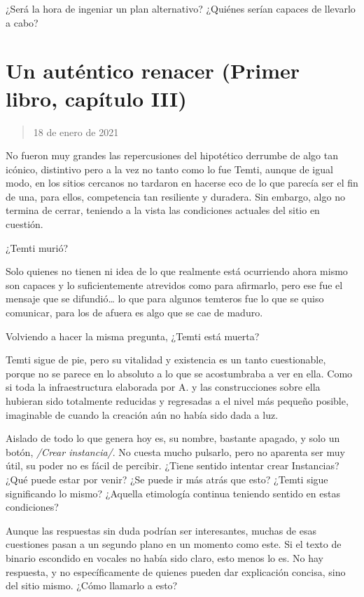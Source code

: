 \documentclass[
  spanish,
]{book}
\begin{document}
¿Será la hora de ingeniar un plan alternativo? ¿Quiénes serían capaces de llevarlo a cabo?

\hypertarget{un-autuxe9ntico-renacer-primer-libro-capuxedtulo-iii}{%
\section{Un auténtico renacer (Primer libro, capítulo III)}\label{un-autuxe9ntico-renacer-primer-libro-capuxedtulo-iii}}

\begin{quote}
18 de enero de 2021
\end{quote}

No fueron muy grandes las repercusiones del hipotético derrumbe de algo tan icónico, distintivo pero a la vez no tanto como lo fue Temti, aunque de igual modo, en los sitios cercanos no tardaron en hacerse eco de lo que parecía ser el fin de una, para ellos, competencia tan resiliente y duradera. Sin embargo, algo no termina de cerrar, teniendo a la vista las condiciones actuales del sitio en cuestión.

¿Temti murió?

Solo quienes no tienen ni idea de lo que realmente está ocurriendo ahora mismo son capaces y lo suficientemente atrevidos como para afirmarlo, pero ese fue el mensaje que se difundió\ldots{} lo que para algunos temteros fue lo que se quiso comunicar, para los de afuera es algo que se cae de maduro.

Volviendo a hacer la misma pregunta, ¿Temti está muerta?

Temti sigue de pie, pero su vitalidad y existencia es un tanto cuestionable, porque no se parece en lo absoluto a lo que se acostumbraba a ver en ella. Como si toda la infraestructura elaborada por A. y las construcciones sobre ella hubieran sido totalmente reducidas y regresadas a el nivel más pequeño posible, imaginable de cuando la creación aún no había sido dada a luz.

Aislado de todo lo que genera hoy es, su nombre, bastante apagado, y solo un botón, \emph{/Crear instancia/}. No cuesta mucho pulsarlo, pero no aparenta ser muy útil, su poder no es fácil de percibir. ¿Tiene sentido intentar crear Instancias? ¿Qué puede estar por venir? ¿Se puede ir más atrás que esto? ¿Temti sigue significando lo mismo? ¿Aquella etimología continua teniendo sentido en estas condiciones?

Aunque las respuestas sin duda podrían ser interesantes, muchas de esas cuestiones pasan a un segundo plano en un momento como este. Si el texto de binario escondido en vocales no había sido claro, esto menos lo es. No hay respuesta, y no específicamente de quienes pueden dar explicación concisa, sino del sitio mismo. ¿Cómo llamarlo a esto?
\end{document}
